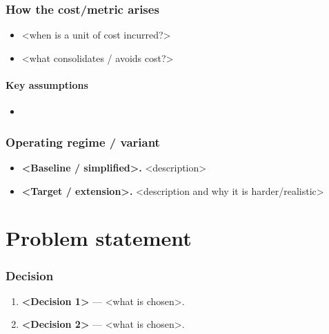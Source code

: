 \section{How the cost/metric arises}
\begin{itemize}
  \item <when is a unit of cost incurred?>
  \item <what consolidates / avoids cost?>
\end{itemize}

\subsection{Key assumptions}
\begin{itemize}
  \item <assumption 1>
\end{itemize}

\section{Operating regime / variant}
\begin{itemize}
  \item \textbf{<Baseline / simplified>.} <description>
  \item \textbf{<Target / extension>.} <description and why it is harder/realistic>
\end{itemize}

\part{Problem statement}

\section{Decision}
\begin{enumerate}
  \item \textbf{<Decision 1>} --- <what is chosen>.
  \item \textbf{<Decision 2>} --- <what is chosen>.
\end{enumerate}

